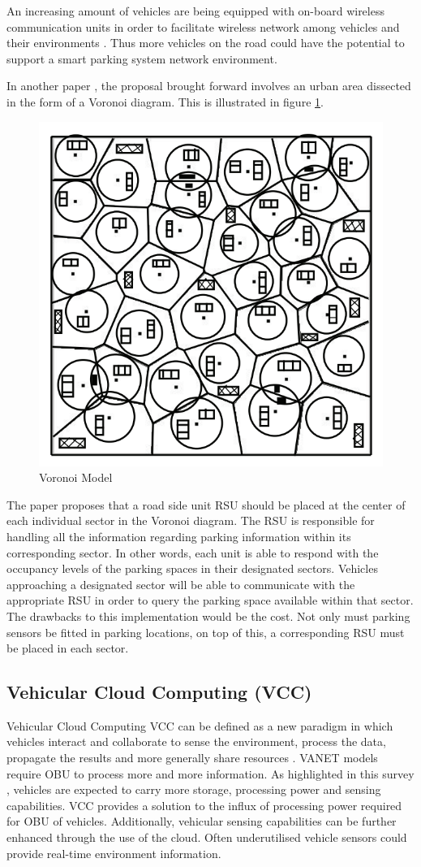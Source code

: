 An increasing amount of vehicles are being equipped with on-board wireless communication units in order to facilitate wireless network among vehicles and their environments \citep{Lin2008SecurityNetworks}. Thus more vehicles on the road could have the potential to support a smart parking system network environment.

In another paper \citep{Panayappan2007VANET-basedAvailability}, the proposal brought forward involves an urban area dissected in the form of a Voronoi diagram. This is illustrated in figure \ref{figure:voronoi}.

\begin{figure}[H]
    \centering
    \includegraphics[width=0.5\linewidth]{./Images/VORONOI.png}
    \caption{Voronoi Model}
    \label{figure:voronoi}
\end{figure}

The paper proposes that a road side unit \ac{RSU} should be placed at the center of each individual sector in the Voronoi diagram. The \ac{RSU} is responsible for handling all the information regarding parking information within its corresponding sector. In other words, each unit is able to respond with the occupancy levels of the parking spaces in their designated sectors. Vehicles approaching a designated sector will be able to communicate with the appropriate \ac{RSU} in order to query the parking space available within that sector. The drawbacks to this implementation would be the cost. Not only must parking sensors be fitted in parking locations, on top of this, a corresponding \ac{RSU} must be placed in each sector.

\pagebreak

\subsection{Vehicular Cloud Computing (VCC)}
Vehicular Cloud Computing \ac{VCC} can be defined as a new paradigm in which vehicles interact and collaborate to sense the environment, process the data, propagate the results and more generally share resources \citep{Mehmood2017Cyber-PhysicalCommunications}. \ac{VANET} models require \ac{OBU} to process more and more information. As highlighted in this survey \citep{Whaiduzzaman2014AComputing}, vehicles are expected to carry more storage, processing power and sensing capabilities. \ac{VCC} provides a solution to the influx of processing power required for \ac{OBU} of vehicles. Additionally, vehicular sensing capabilities can be further enhanced through the use of the cloud. Often underutilised vehicle sensors could provide real-time environment information.

